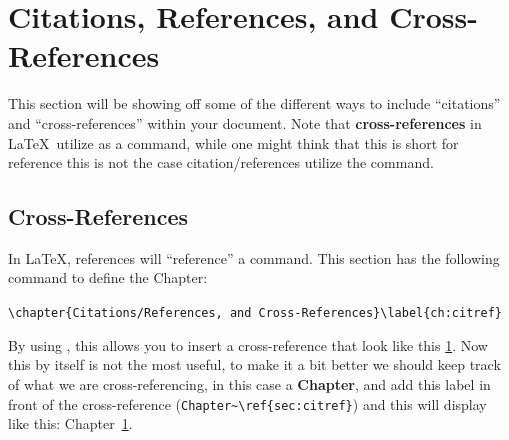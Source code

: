 \chapter{Citations, References, and Cross-References}\label{ch:citref}
	This section will be showing off some of the different ways to include \enquote{citations} and \enquote{cross-references} within your document.
	Note that \textbf{cross-references} in \LaTeX\ utilize  as a command, while one might think that this is short for reference this is not the case citation/references utilize the  command.
	\section{Cross-References}
		In \LaTeX, references will \enquote{reference} a  command. 
		This section has the following command to define the Chapter:
		\begin{Center}
			\lstinline[basicstyle=\ttfamily]|\chapter{Citations/References, and Cross-References}\label{ch:citref}|
		\end{Center}

		By using , this allows you to insert a cross\hyp{}reference that look like this \ref{ch:citref}.
		Now this by itself is not the most useful, to make it a bit better we should keep track of what we are cross\hyp{}referencing, in this case a \textbf{Chapter}, and add this label in front of the cross\hyp{}reference (\lstinline[basicstyle=\ttfamily]|Chapter~\ref{sec:citref}|) and this will display like this: Chapter~\ref{ch:citref}.
		

